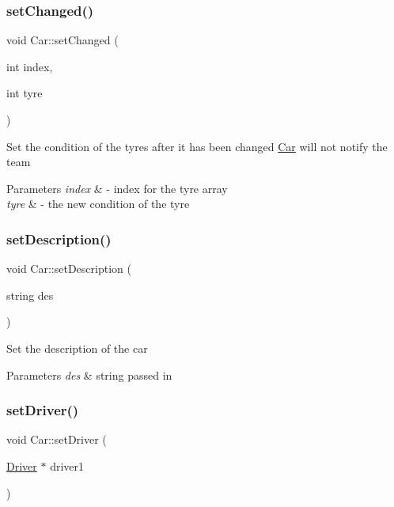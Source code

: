 \subsubsection{\texorpdfstring{set\+Changed()}{setChanged()}}
{\footnotesize\ttfamily void Car\+::set\+Changed (\begin{DoxyParamCaption}\item[{int}]{index,  }\item[{int}]{tyre }\end{DoxyParamCaption})}

Set the condition of the tyres after it has been changed \mbox{\hyperlink{class_car}{Car}} will not notify the team 
\begin{DoxyParams}{Parameters}
{\em index} & -\/ index for the tyre array \\
\hline
{\em tyre} & -\/ the new condition of the tyre \\
\hline
\end{DoxyParams}
\mbox{\label{class_car_a0dcda3633cafc81e96dffcbdc5bdeeb0}} 
\subsubsection{\texorpdfstring{set\+Description()}{setDescription()}}
{\footnotesize\ttfamily void Car\+::set\+Description (\begin{DoxyParamCaption}\item[{string}]{des }\end{DoxyParamCaption})}

Set the description of the car 
\begin{DoxyParams}{Parameters}
{\em des} & string passed in \\
\hline
\end{DoxyParams}
\mbox{\label{class_car_a9da54533fe2d029ab4300d1b8682c69f}} 
\subsubsection{\texorpdfstring{set\+Driver()}{setDriver()}}
{\footnotesize\ttfamily void Car\+::set\+Driver (\begin{DoxyParamCaption}\item[{\mbox{\hyperlink{class_driver}{Driver}} $\ast$}]{driver1 }\end{DoxyParamCaption})\hspace{0.3cm}{\ttfamily [inline]}}

